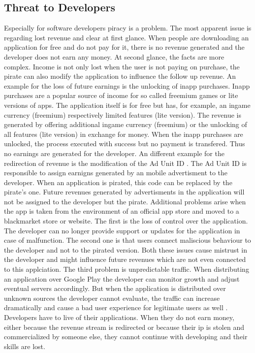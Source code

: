 \subsection{Threat to Developers} \label{subsection:foundation-piracy-developers}
Especially for software developers piracy is a problem.
The most apparent issue is regarding lost revenue and clear at first glance.
\newline
When people are downloading an application for free and do not pay for it, there is no revenue generated and the developer does not earn any money.
\newline
At second glance, the facts are more complex.
Income is not only lost when the user is not paying on purchase, the pirate can also modify the application to influence the follow up revenue.
An example for the loss of future earnings is the unlocking of inapp purchases.
Inapp purchases are a popular source of income for so called freemium games or lite versions of apps.
The application itself is for free but has, for example, an ingame currency (freemium) respectively limited features (lite version).
The revenue is generated by offering additional ingame currency (freemium) or the unlocking of all features (lite version) in exchange for money.
When the inapp purchases are unlocked, the process executed with success but no payment is transfered.
Thus no earnings are generated for the developer.
\newline
An different example for the redirection of revenue is the modification of the Ad Unit ID \cite{googleAdmob}.
The Ad Unit ID is responsible to assign earnigns generated by an mobile advertisment to the developer.
When an application is pirated, this code can be replaced by the pirate's one. Future revenues generated by advertisments in the application will not be assigned to the developer but the pirate.
\newline
\newline
Additional problems arise when the app is taken from the environment of an official app store and moved to a blackmarket store or website.
The first is the loss of control over the application.
The developer can no longer provide support or updates for the application in case of malfunction.
The second one is that users connect maliscious behaviour to the developer and not to the pirated version.
Both these issues cause mistrust in the developer and might influence future revenues which are not even connected to this applciation.
The third problem is unpredictable traffic.
When distributing an application over Google Play the developer can monitor growth and adjust eventual servers accordingly.
But when the application is distributed over unknown sources the developer cannot evaluate, the traffic can increase dramatically and cause a bad user experience for legitimate users as well \cite{lierschDeveloperThreats}.
\newline
\newline
Developers have to live of their applications.
When they do not earn money, either because the revenue stream is redirected or because their \gls{ip} is stolen and commercialized by someone else, they cannot continue with developing and their skills are lost.



